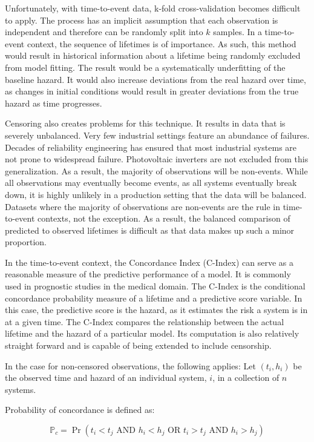 Unfortunately, with time-to-event data, k-fold cross-validation becomes difficult to apply. The process has an implicit assumption that each observation is independent and therefore can be randomly split into $k$ samples. In a time-to-event context, the sequence of lifetimes is of importance. As such, this method would result in historical information about a lifetime being randomly excluded from model fitting. The result would be a systematically underfitting of the baseline hazard. It would also increase deviations from the real hazard over time, as changes in initial conditions would result in greater deviations from the true hazard as time progresses.


Censoring also creates problems for this technique. It results in data that is severely unbalanced. Very few industrial settings feature an abundance of failures. Decades of reliability engineering has ensured that most industrial systems are not prone to widespread failure. Photovoltaic inverters are not excluded from this generalization\cite{Petrone2008}. As a result, the majority of observations will be non-events. While all observations may eventually become events, as all systems eventually break down, it is highly unlikely in a production setting that the data will be balanced. Datasets where the majority of observations are non-events are the rule in time-to-event contexts, not the exception. As a result, the balanced comparison of predicted to observed lifetimes is difficult as that data makes up such a minor proportion. 

In the time-to-event context, the Concordance Index (C-Index) can serve as a reasonable measure of the predictive performance of a model. It is commonly used in prognostic studies in the medical domain\cite{Tripepi2010}. The C-Index is the conditional concordance probability measure of a lifetime and a predictive score variable\cite{Kang2015}. In this case, the predictive score is the hazard, as it estimates the risk a system is in at a given time. The C-Index compares the relationship between the actual lifetime and the hazard of a particular model. Its computation is also relatively straight forward and is capable of being extended to include censorship.

In the case for non-censored observations, the following applies: Let $(t_i, h_i)$ be the observed time and hazard of an individual system, $i$, in a collection of $n$ systems.

Probability of concordance is defined as:

$$\mathbb{P}_c  = \Pr(t_i  < t_j \text{ AND } h_i < h_j \text{ OR } t_i  > t_j \text{ AND } h_i > h_j)  $$

